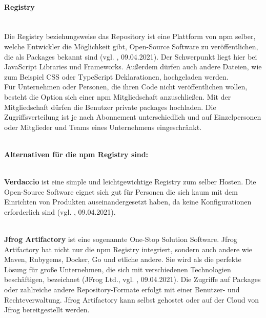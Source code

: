 \paragraph{Registry}
\mbox{}\\
Die Registry beziehungsweise das Repository ist eine Plattform von npm selber, welche Entwickler die Möglichkeit gibt, Open-Source Software zu veröffentlichen, die als Packages bekannt sind (vgl. \cite{npm_registry_2021}, 09.04.2021). Der Schwerpunkt liegt hier bei JavaScript Libraries und Frameworks. Außerdem dürfen auch andere Dateien, wie zum Beispiel CSS oder TypeScript Deklarationen, hochgeladen werden.
\\
Für Unternehmen oder Personen, die ihren Code nicht veröffentlichen wollen, besteht die Option sich einer npm Mitgliedschaft anzuschließen. Mit der Mitgliedschaft dürfen die Benutzer private packages hochladen. Die Zugriffsverteilung ist je nach Abonnement unterschiedlich und auf Einzelpersonen oder Mitglieder und Teams eines Unternehmens eingeschränkt.

\mbox{}\\
\textbf{Alternativen für die npm Registry sind:}

\mbox{}\\
\textbf{Verdaccio} ist eine simple und leichtgewichtige Registry zum selber Hosten. Die Open-Source Software eignet sich gut für Personen die sich kaum mit dem Einrichten von Produkten auseinandergesetzt haben, da keine Konfigurationen erforderlich sind (vgl. \cite{verdaccio_2021}, 09.04.2021).

\mbox{}\\
\textbf{Jfrog Artifactory} ist eine sogenannte One-Stop Solution Software. Jfrog Artifactory hat nicht nur die npm Registry integriert, sondern auch andere wie Maven, Rubygems, Docker, Go und etliche andere. Sie wird als die perfekte Lösung für große Unternehmen, die sich mit verschiedenen Technologien beschäftigen, bezeichnet (JFrog Ltd., vgl. \cite{jfrog_2021}, 09.04.2021). Die Zugriffe auf Packages oder zahlreiche andere Repository-Formate erfolgt mit einer Benutzer- und Rechteverwaltung. Jfrog Artifactory kann selbst gehostet oder auf der Cloud von Jfrog bereitgestellt werden.

